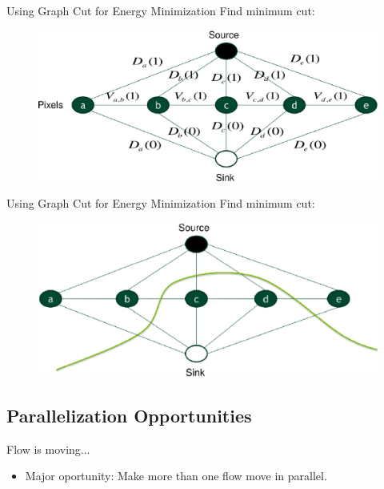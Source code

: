 \documentclass{beamer}
\begin{document}
\begin{frame}{Using Graph Cut for Energy Minimization}
   Find minimum cut:
   \begin{figure}
   \includegraphics[scale=0.5]{graph} 
   \end{figure}
\end{frame}

\begin{frame}{Using Graph Cut for Energy Minimization}
   Find minimum cut:
   \begin{figure}
   \includegraphics[scale=0.5]{graph2} 
   \end{figure}
\end{frame}

\subsection{Parallelization Opportunities}

\begin{frame}{Flow is moving...}
	  \begin{itemize}
	    \item
	    Major oportunity: Make more than one flow move in parallel.
	  \end{itemize}
\end{frame}
\end{document}
